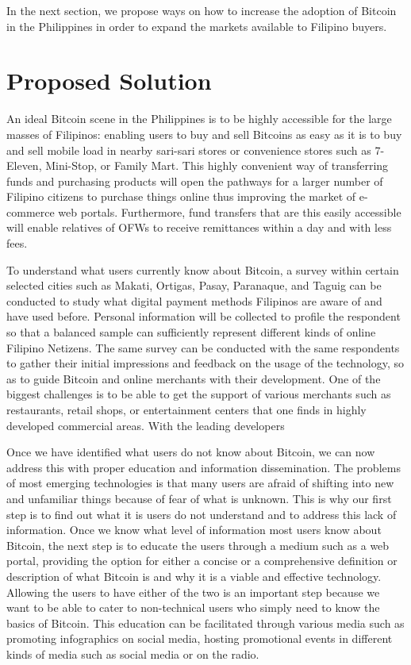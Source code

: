\documentclass{acm_proc_article-sp}
\begin{document}
In the next section, we propose ways on how to increase the adoption of Bitcoin in the Philippines in order to expand the markets available to Filipino buyers.

\section{Proposed Solution}

An ideal Bitcoin scene in the Philippines is to be highly accessible for the large masses of Filipinos: enabling users to buy and sell Bitcoins as easy as it is to buy and sell mobile load in nearby sari-sari stores or convenience stores such as 7-Eleven, Mini-Stop, or Family Mart. This highly convenient way of transferring funds and purchasing products will open the pathways for a larger number of Filipino citizens to purchase things online thus improving the market of e-commerce web portals. Furthermore, fund transfers that are this easily accessible will enable relatives of OFWs to receive remittances within a day and with less fees.

To understand what users currently know about Bitcoin, a survey within certain selected cities such as Makati, Ortigas, Pasay, Paranaque, and Taguig can be conducted to study what digital payment methods Filipinos are aware of and have used before. Personal information will be collected to profile the respondent so that a balanced sample can sufficiently represent different kinds of online Filipino Netizens.  The same survey can be conducted with the same respondents to gather their initial impressions and feedback on the usage of the technology, so as to guide Bitcoin and online merchants with their development. One of the biggest challenges is to be able to get the support of various merchants such as restaurants, retail shops, or entertainment centers that one finds in highly developed commercial areas. With the leading developers

Once we have identified what users do not know about Bitcoin, we can now address this with proper education and information dissemination. The problems of most emerging technologies is that many users are afraid of shifting into new and unfamiliar things because of fear of what is unknown. This is why our first step is to find out what it is users do not understand and to address this lack of information. Once we know what level of information most users know about Bitcoin, the next step is to educate the users through a medium such as a web portal, providing the option for either a concise or a comprehensive definition or description of what Bitcoin is and why it is a viable and effective technology. Allowing the users to have either of the two is an important step because we want to be able to cater to non-technical users who simply need to know the basics of Bitcoin. This education can be facilitated through various media such as promoting infographics on social media, hosting promotional events in different kinds of media such as social media or on the radio. 
\end{document}
